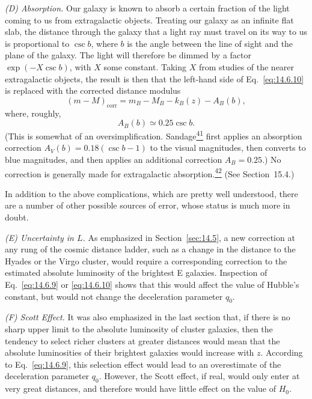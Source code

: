\medskip
\noindent\textit{(D) Absorption.}
Our galaxy is known to absorb a certain fraction of the light coming to us
from extragalactic objects. Treating our galaxy as an infinite flat slab, the
distance through the galaxy that a light ray must travel on its way to us is
proportional to \(\csc b\), where \(b\) is the angle between the line of
sight and the plane of the galaxy. The light will therefore be dimmed by a
factor \(\exp(-X\csc b)\), with \(X\) some constant. Taking \(X\) from
studies of the nearer extragalactic objects, the result is then that the
left-hand side of Eq.~\eqref{eq:14.6.10} is replaced with the corrected
distance modulus
\[
  (m-M)_{\mathrm{corr}}
  =
  m_B-M_B-k_B(z)-A_B(b),
\]
where, roughly,
\[
  A_B(b)\simeq0.25\csc b.
\]
(This is somewhat of an oversimplification.
Sandage\hyperref[ch14-ref-41]{\textsuperscript{41}} first applies an
absorption correction \(A_V(b)=0.18(\csc b-1)\) to the visual magnitudes,
then converts to blue magnitudes, and then applies an additional correction
\(A_B=0.25\).) No correction is generally made for extragalactic
absorption.\hyperref[ch14-ref-42]{\textsuperscript{42}} (See
Section~15.4.)

In addition to the above complications, which are pretty well understood,
there are a number of other possible sources of error, whose status is much
more in doubt.

\medskip
\noindent\textit{(E) Uncertainty in \(L\).}
As emphasized in Section~\ref{sec:14.5}, a new correction at any rung of the
cosmic distance ladder, such as a change in the distance to the Hyades or the
Virgo cluster, would require a corresponding correction to the estimated
absolute luminosity of the brightest E galaxies. Inspection of
Eq.~\eqref{eq:14.6.9} or \eqref{eq:14.6.10} shows that this would affect the
value of Hubble's constant, but would not change the deceleration parameter
\(q_0\).

\medskip
\noindent\textit{(F) Scott Effect.}
It was also emphasized in the last section that, if there is no sharp upper
limit to the absolute luminosity of cluster galaxies, then the tendency to
select richer clusters at greater distances would mean that the absolute
luminosities of their brightest galaxies would increase with \(z\).
According to Eq.~\eqref{eq:14.6.9}, this selection effect would lead to an
overestimate of the deceleration parameter \(q_0\). However, the Scott
effect, if real, would only enter at very great distances, and therefore
would have little effect on the value of \(H_0\).

